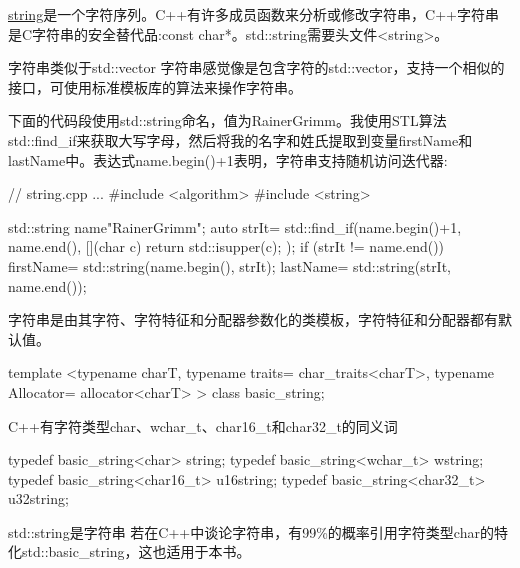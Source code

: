 
\href{http://en.cppreference.com/w/cpp/string/basic_string}{string}是一个字符序列。C++有许多成员函数来分析或修改字符串，C++字符串是C字符串的安全替代品:const char*。std::string需要头文件<string>。



\begin{myTip}{字符串类似于std::vector}
字符串感觉像是包含字符的std::vector，支持一个相似的接口，可使用标准模板库的算法来操作字符串。

下面的代码段使用std::string命名，值为RainerGrimm。我使用STL算法std::find\_if来获取大写字母，然后将我的名字和姓氏提取到变量firstName和lastName中。表达式name.begin()+1表明，字符串支持随机访问迭代器:


\begin{cpp}
// string.cpp
...
#include <algorithm>
#include <string>

std::string name{"RainerGrimm"};
auto strIt= std::find_if(name.begin()+1, name.end(),
						[](char c){ return std::isupper(c); });
if (strIt != name.end()){
	firstName= std::string(name.begin(), strIt);
	lastName= std::string(strIt, name.end());
}
\end{cpp}
\end{myTip}

字符串是由其字符、字符特征和分配器参数化的类模板，字符特征和分配器都有默认值。

\begin{cpp}
template <typename charT,
		  typename traits= char_traits<charT>,
		  typename Allocator= allocator<charT> >
class basic_string;
\end{cpp}

C++有字符类型char、wchar\_t、char16\_t和char32\_t的同义词

\begin{cpp}
typedef basic_string<char> string;
typedef basic_string<wchar_t> wstring;
typedef basic_string<char16_t> u16string;
typedef basic_string<char32_t> u32string;
\end{cpp}

\begin{myTip}{std::string是字符串}
若在C++中谈论字符串，有99\%的概率引用字符类型char的特化std::basic\_string，这也适用于本书。
\end{myTip}


























